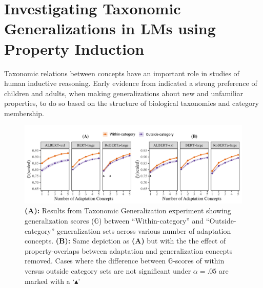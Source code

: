 \documentclass[10pt,letterpaper]{article}
\begin{document}
\section{Investigating Taxonomic Generalizations in LMs using Property Induction}
Taxonomic relations between concepts have an important role in studies of human inductive reasoning.
Early evidence from \citet{gelman1986categories} indicated a strong preference of children and adults, when making generalizations about new and unfamiliar properties, to do so based on the structure of biological taxonomies and category membership.
\begin{figure}[h]
    \centering
    \includegraphics[width=\textwidth]{withwithoutoverlaps.pdf}
    \caption{\textbf{(A):} Results from Taxonomic Generalization experiment showing generalization scores ($\mathbb{G}$) between ``Within-category'' and ``Outside-category'' generalization sets across various number of adaptation concepts. \textbf{(B):} Same depiction as \textbf{(A)} but with the the effect of property-overlaps between adaptation and generalization concepts removed. Cases where the difference between $\mathbb{G}$-scores of within versus outside category sets are not significant under $\alpha = .05$ are marked with a `$\blacktriangle$'}
    \label{fig:taxonomicresults}
\end{figure}
\end{document}
